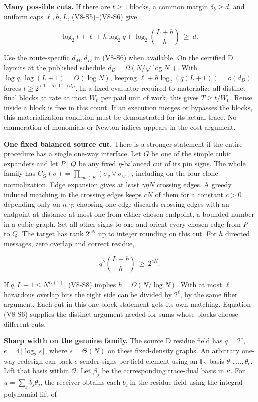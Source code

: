 \documentclass[
  11pt,
]{article}
\begin{document}
\textbf{Many possible cuts.} If there are \(t\ge1\) blocks, a common
margin \(\delta_b\ge d\), and uniform caps \(\ell,h,L\), (V8-S5)--(V8-S6) give

\[
 \log_2 t+\ell+h\log_2 q+\log_2{L+h\choose h}\ \ge\ d.               \tag{V8-S7}
\]

Use the route-specific \(d_M,d_D\) in (V8-S6) when available. On the
certified D layouts at the published schedule
\(d_D=\Omega(N/\sqrt{\log N})\). With \(\log q,\log(L+1)=O(\log N)\),
keeping \(\ell+h\log_2(q(L+1))=o(d_D)\) forces \(t\ge2^{(1-o(1))d_D}\).
In a fixed evaluator required to materialize all distinct final blocks
at rate at most \(W_0\) per paid unit of work, this gives
\(T\ge t/W_0\). Reuse inside a block is free in this count. If an
execution merges or bypasses the blocks, this materialization condition
must be demonstrated for its actual trace. No enumeration of monomials
or Newton indices appears in the cost argument.

\textbf{One fixed balanced source cut.} There is a stronger statement if
the entire procedure has a single one-way interface. Let \(G\) be one of
the simple cubic expanders and let \(P\mid Q\) be any fixed
\(\eta\)-balanced cut of its pin signs. The whole family has
\(C_G(\sigma)=\prod_{vw\in E}(\sigma_v\lor\sigma_w)\), including on the
four-clone normalization. Edge expansion gives at least \(\gamma\eta N\)
crossing edges. A greedy induced matching in the crossing edges keeps
\(cN\) of them for a constant \(c>0\) depending only on \(\eta,\gamma\):
choosing one edge discards crossing edges with an endpoint at distance
at most one from either chosen endpoint, a bounded number in a cubic
graph. Set all other signs to one and orient every chosen edge from
\(P\) to \(Q\). The target has rank \(2^{cN}\) up to integer rounding on
this cut. For \(h\) directed messages, zero overlap and correct residue,

\[
             q^h {L+h\choose h}\ \ge\ 2^{cN}.
                                                                    \tag{V8-S8}
\]

If \(q,L+1\le N^{O(1)}\), (V8-S8) implies \(h=\Omega(N/\log N)\). With at
most \(\ell\) hazardous overlap bits the right side can be divided by
\(2^\ell\), by the same fiber argument. Each cut in this one-block
statement gets its own matching. Equation (V8-S6) supplies the distinct
argument needed for sums whose blocks choose different cuts.

\textbf{Sharp width on the genuine family.} The source D residue field
has \(q=2^e\), \(e=4\lceil\log_2 s\rceil\), where \(s=\Theta(N)\) on
these fixed-density graphs. An arbitrary one-way redesign can pack \(e\)
sender signs per field element using an \(\mathbb F_2\)-basis
\(\theta_1,\ldots,\theta_e\). Lift that basis within \(\mathcal O\). Let
\(\beta_j\) be the corresponding trace-dual basis in \(\kappa\). For
\(u=\sum_j b_j\theta_j\), the receiver obtains each \(b_j\) in the
residue field using the integral polynomial lift of
\end{document}
